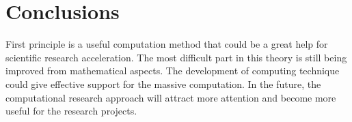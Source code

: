 \documentclass[letterpaper,12pt]{article}
\begin{document}
\section{Conclusions}
First principle is a useful computation method that could be a great help for scientific research acceleration. The most difficult part in this theory is still being improved from mathematical aspects. The development of computing technique could give effective support for the massive computation. In the future, the computational research approach will attract more attention and become more useful for the research projects.



\end{document}
